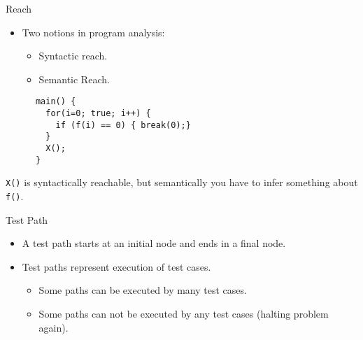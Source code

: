 \documentclass[handout]{beamer}
\begin{document}
\begin{frame}[fragile]{Reach}
  \begin{itemize}
  \item Two notions in program analysis:
    \begin{itemize}
    \item Syntactic reach. 
    \item Semantic Reach.
    \end{itemize}
   \end{itemize}
\begin{lstlisting}
      main() {
        for(i=0; true; i++) {
          if (f(i) == 0) { break(0);}
        }
        X();
      }
\end{lstlisting}
{\tt X()}  is syntactically reachable, but
semantically you have to infer something about {\tt f()}.
\end{frame}
\begin{frame}{Test Path}
   \begin{itemize}
   \item  A test path starts at an initial node and ends in a final
     node.
   \item Test paths represent execution of test cases.
     \begin{itemize}
     \item  Some paths can be executed by many test cases.
     \item Some paths can not be executed by any test cases (halting
       problem again).
     \end{itemize}
   \end{itemize}
\end{frame}
\end{document}
